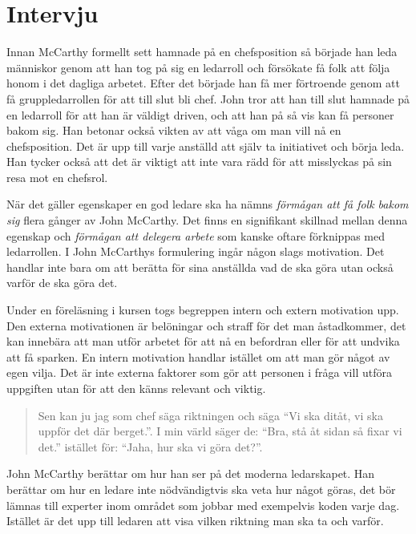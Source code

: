 \section{Intervju}
Innan McCarthy formellt sett hamnade på en chefsposition så började han leda människor genom att han tog på sig en ledarroll och försökate få folk att följa honom i det dagliga arbetet. Efter det började han få mer förtroende genom att få gruppledarrollen för att till slut bli chef. John tror att han till slut hamnade på en ledarroll för att han är väldigt driven, och att han på så vis kan få personer bakom sig. Han betonar också vikten av att våga om man vill nå en chefsposition. Det är upp till varje anställd att själv ta initiativet och börja leda. Han tycker också att det är viktigt att inte vara rädd för att misslyckas på sin resa mot en chefsrol.

När det gäller egenskaper en god ledare ska ha nämns \textit{förmågan att få folk bakom sig} flera gånger av John McCarthy. Det finns en signifikant skillnad mellan denna egenskap och \textit{förmågan att delegera arbete} som kanske oftare förknippas med ledarrollen. I John McCarthys formulering ingår någon slags motivation. Det handlar inte bara om att berätta för sina anställda vad de ska göra utan också varför de ska göra det.

Under en föreläsning i kursen togs begreppen intern och extern motivation upp\citep{motivation}. Den externa motivationen är belöningar och straff för det man åstadkommer, det kan innebära att man utför arbetet för att nå en befordran eller för att undvika att få sparken. En intern motivation handlar istället om att man gör något av egen vilja. Det är inte externa faktorer som gör att personen i fråga vill utföra uppgiften utan för att den känns relevant och viktig.

\begin{quote}
 Sen kan ju jag som chef säga riktningen och säga ``Vi ska ditåt, vi ska uppför det där berget.''. I min värld säger de: ``Bra, stå åt sidan så fixar vi det.'' istället för: ``Jaha, hur ska vi göra det?''.
\end{quote}

John McCarthy berättar om hur han ser på det moderna ledarskapet. Han berättar om hur en ledare inte nödvändigtvis ska veta hur något göras, det bör lämnas till experter inom området som jobbar med exempelvis koden varje dag. Istället är det upp till ledaren att  visa vilken riktning man ska ta och varför.

